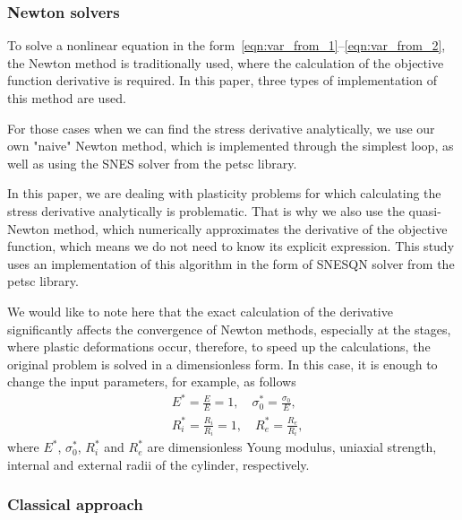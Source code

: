 \documentclass[12pt]{article}
\begin{document}
\subsubsection{Newton solvers}
To solve a nonlinear equation in the form~\eqref{eqn:var_from_1}--\eqref{eqn:var_from_2}, the Newton method is traditionally used, where the calculation of the objective function derivative is required. In this paper, three types of implementation of this method are used.

For those cases when we can find the stress derivative analytically, we use our own "naive" Newton method, which is implemented through the simplest loop, as well as using the SNES solver from the petsc library. 

In this paper, we are dealing with plasticity problems for which calculating the stress derivative analytically is problematic. That is why we also use the quasi-Newton method, which numerically approximates the derivative of the objective function, which means we do not need to know its explicit expression. This study uses an implementation of this algorithm in the form of SNESQN solver from the petsc library.

We would like to note here that the exact calculation of the derivative significantly affects the convergence of Newton methods, especially at the stages, where plastic deformations occur, therefore, to speed up the calculations, the original problem is solved in a dimensionless form. In this case, it is enough to change the input parameters, for example, as follows
\begin{align*}
    & E^* = \frac{E}{E} = 1, \quad \sigma_0^* = \frac{\sigma_0}{E}, \\
    & R_i^* = \frac{R_i}{R_i} = 1, \quad R_e^* = \frac{R_e}{R_i},
\end{align*}
where $E^*$, $\sigma_0^*$, $R_i^*$ and $R_e^*$ are dimensionless Young modulus, uniaxial strength, internal and external radii of the cylinder, respectively.

\subsubsection{Classical approach}
\label{sec:development:classical_approach}
\end{document}
